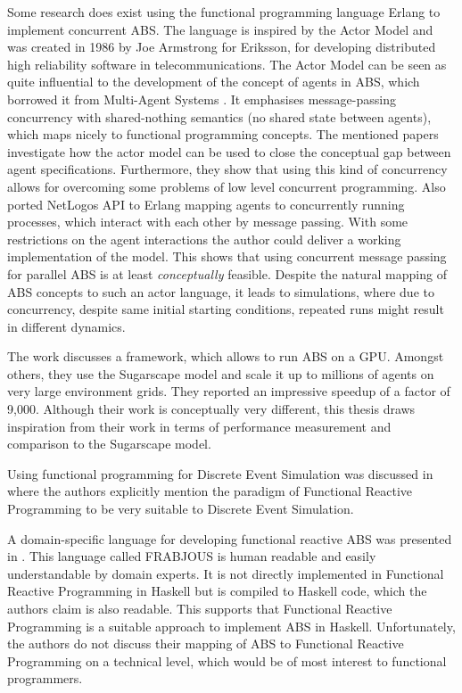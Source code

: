 Some research does exist \cite{di_stefano_using_2005, sher_agent-based_2013, varela_modelling_2004} using the functional programming language Erlang \cite{armstrong_erlang_2010} to implement concurrent ABS. The language is inspired by the Actor Model \cite{agha_actors:_1986} and was created in 1986 by Joe Armstrong for Eriksson, for developing distributed high reliability software in telecommunications. The Actor Model can be seen as quite influential to the development of the concept of agents in ABS, which borrowed it from Multi-Agent Systems \cite{wooldridge_introduction_2009}. It emphasises message-passing concurrency with shared-nothing semantics (no shared state between agents), which maps nicely to functional programming concepts. The mentioned papers investigate how the actor model can be used to close the conceptual gap between agent specifications. Furthermore, they show that using this kind of concurrency allows for overcoming some problems of low level concurrent programming.
Also \cite{bezirgiannis_improving_2013} ported NetLogos API to Erlang mapping agents to concurrently running processes, which interact with each other by message passing. With some restrictions on the agent interactions the author could deliver a working implementation of the model. This shows that using concurrent message passing for parallel ABS is at least \textit{conceptually} feasible. Despite the natural mapping of ABS concepts to such an actor language, it leads to simulations, where due to concurrency, despite same initial starting conditions, repeated runs might result in different dynamics.

The work \cite{lysenko_framework_2008} discusses a framework, which allows to run ABS on a GPU. Amongst others, they use the Sugarscape model and scale it up to millions of agents on very large environment grids. They reported an impressive speedup of a factor of 9,000. Although their work is conceptually very different, this thesis draws inspiration from their work in terms of performance measurement and comparison to the Sugarscape model.

Using functional programming for Discrete Event Simulation was discussed in \cite{jankovic_functional_2007} where the authors explicitly mention the paradigm of Functional Reactive Programming to be very suitable to Discrete Event Simulation.

A domain-specific language for developing functional reactive ABS was presented in \cite{schneider_towards_2012,vendrov_frabjous_2014}. This language called FRABJOUS is human readable and easily understandable by domain experts. It is not directly implemented in Functional Reactive Programming in Haskell but is compiled to Haskell code, which the authors claim is also readable. This supports that Functional Reactive Programming is a suitable approach to implement ABS in Haskell. Unfortunately, the authors do not discuss their mapping of ABS to Functional Reactive Programming on a technical level, which would be of most interest to functional programmers.

